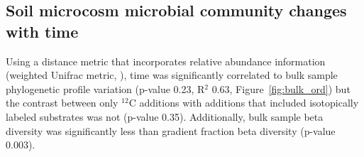 \subsection{Soil microcosm microbial community changes with time}
Using a distance metric that incorporates relative abundance information
(weighted Unifrac metric, \citep{Lozupone_2005}), 
time was significantly correlated to bulk sample phylogenetic profile variation (p-value
0.23, R$^{2}$ 0.63, Figure~\ref{fig:bulk_ord}) but the contrast between only
$^{12}$C additions with additions that included isotopically labeled substrates
was not (p-value 0.35). Additionally, bulk sample beta diversity was significantly
less than gradient fraction beta diversity (p-value 0.003). 